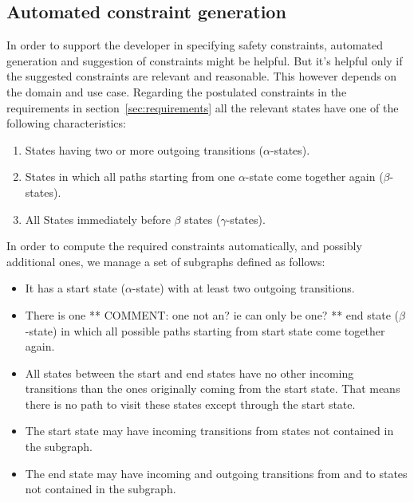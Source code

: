 \documentclass[conference]{IEEEtran}
\begin{document}
\subsection{Automated constraint generation}
\label{sec:automatedconstraintgeneration}

In order to support the developer in specifying safety constraints, automated generation and suggestion of constraints might be helpful. But it's helpful only if the suggested constraints are relevant and reasonable. This however depends on the domain and use case.
Regarding the postulated constraints in the requirements in section~\ref{sec:requirements} all the relevant states have one of the following characteristics:

\begin{enumerate}
	\item States having two or more outgoing transitions ($\alpha$-states).
	\item States in which all paths starting from one $\alpha$-state come together again ($\beta$-states).
	\item All States immediately before $\beta$ states ($\gamma$-states).
\end{enumerate}

In order to compute the required constraints automatically, and possibly additional ones, we manage a set of subgraphs defined as follows:

\begin{itemize}
	\item It has a start state ($\alpha$-state) with at least two outgoing transitions.
	\item There is one ** COMMENT: one not an? ie can only be one? ** end state ($\beta$-state) in which all possible paths starting from start state come together again.
	\item All states between the start and end states have no other incoming transitions than the ones originally coming from the start state. That means there is no path to visit these states except through the start state.
	\item The start state may have incoming transitions from states not contained in the subgraph.
	\item The end state may have incoming and outgoing transitions from and to states not contained in the subgraph.
\end{itemize}
\end{document}
